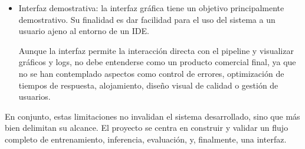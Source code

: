 \begin{itemize}
    No obstante, las métricas objetivas no siempre reflejan completamente la percepción auditiva humana y de hecho, se repite en numerosas ocasiones en el estado del arte que métricas numéricas no suelen ser una medida fiable de calidad, las métricas objetivas son reproducibles pero no capturan todas las dimensiones perceptuales; una evaluación auditiva sería complementaria. Dos separaciones con valores similares de SI-SDR pueden percibirse de manera diferente en términos de ruido, naturalidad o inteligibilidad de la voz. Por ello, la escucha perceptual se consideró necesaria para interpretar los resultados. Se tenía intención de
    realizar una encuesta de evaluación pública con diferentes salidas del modelo para cada una de las funciones de pérdida, pero por falta de tiempo se terminó por dejar de lado.

    \item Interfaz demostrativa: la interfaz gráfica tiene un objetivo principalmente demostrativo. Su finalidad es dar facilidad para el uso del sistema a un usuario ajeno al entorno de un IDE.
    
    Aunque la interfaz permite la interacción directa con el pipeline y visualizar gráficos y logs, no debe entenderse como un producto comercial final, ya que no se han contemplado aspectos como control de errores, optimización de tiempos de respuesta, alojamiento, diseño visual de calidad o gestión de usuarios.

\end{itemize}

En conjunto, estas limitaciones no invalidan el sistema desarrollado, sino que más bien delimitan su alcance. El proyecto se centra en construir y validar un flujo completo de entrenamiento, inferencia, evaluación, y, finalmente, una interfaz. 